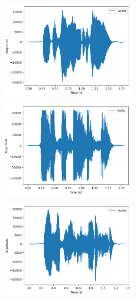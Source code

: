 \documentclass[11pt]{article}
\begin{document}
\begin{figure}
\begin{subfigure}{.5\textwidth}
\begin{subfigure}{.18\textwidth}
  \centering
  \includegraphics[width=\linewidth]{"Bilder/art_neutral.png"}
  \label{fig:sfig1}
\end{subfigure}%
\begin{subfigure}{.18\textwidth}
  \centering
  \includegraphics[width=\linewidth]{Bilder/art_angry.png}
  \label{fig:sfig2}
\end{subfigure}
\begin{subfigure}{.18\textwidth}
  \centering
  \includegraphics[width=\linewidth]{Bilder/art_happy.png}

\end{subfigure}
\end{subfigure}
\end{figure}
\end{document}
